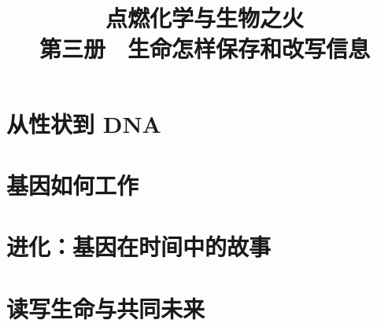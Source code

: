 \documentclass[12pt,openany,fontset=none,UTF8,scheme=chinese]{ctexbook}
\title{点燃化学与生物之火\\第三册　生命怎样保存和改写信息}
\author{}
\date{}
\begin{document}
\frontmatter
\maketitle
\tableofcontents

\mainmatter
\setcounter{part}{7}
\setcounter{chapter}{62}

\part{从性状到 DNA}





\part{基因如何工作}










\part{进化：基因在时间中的故事}






\part{读写生命与共同未来}








\backmatter
\appendix
\end{document}
